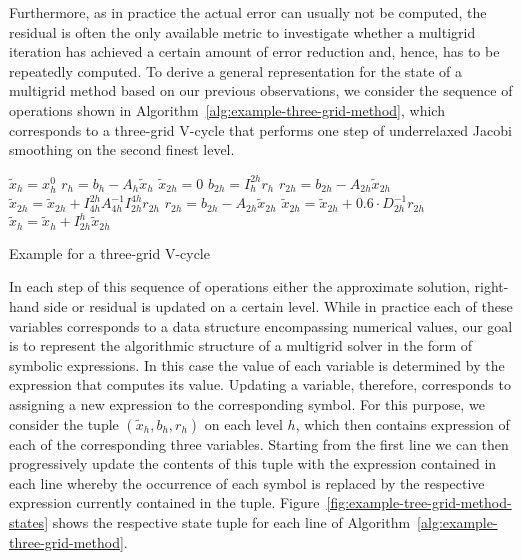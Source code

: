 Furthermore, as in practice the actual error can usually not be computed, the residual is often the only available metric to investigate whether a multigrid iteration has achieved a certain amount of error reduction and, hence, has to be repeatedly computed.
To derive a general representation for the state of a multigrid method based on our previous observations, we consider the sequence of operations shown in Algorithm~\ref{alg:example-three-grid-method}, which corresponds to a three-grid V-cycle that performs one step of underrelaxed Jacobi smoothing on the second finest level.
\begin{algorithm}
	\begin{algorithmic}[1]
		\State $\tilde{x}_{h} = x_{h}^0$
		\State $r_{h} = b_{h} - A_h \tilde{x}_{h} $
		\State $ \tilde{x}_{2h} = 0$
		\State $ b_{2h} = I_{h}^{2h} r_{h}$
		\State $ r_{2h} = b_{2h} - A_{2h} \tilde{x}_{2h}$
		\State $ \tilde{x}_{2h} = \tilde{x}_{2h} + I_{4h}^{2h} A_{4h}^{-1} I_{2h}^{4h} r_{2h}$
		\State $ r_{2h} = b_{2h} - A_{2h} \tilde{x}_{2h}$
		\State $ \tilde{x}_{2h} = \tilde{x}_{2h} + 0.6 \cdot D_{2h}^{-1} r_{2h}$
		\State $\tilde{x}_{h} = \tilde{x}_{h}  + I_{2h}^h \tilde{x}_{2h}$
	\end{algorithmic}
\caption{Example for a three-grid V-cycle}
\label{alg:example-three-grid-method}
\end{algorithm}
In each step of this sequence of operations either the approximate solution, right-hand side or residual is updated on a certain level.
While in practice each of these variables corresponds to a data structure encompassing numerical values, our goal is to represent the algorithmic structure of a multigrid solver in the form of symbolic expressions.
In this case the value of each variable is determined by the expression that computes its value.
Updating a variable, therefore, corresponds to assigning a new expression to the corresponding symbol.
For this purpose, we consider the tuple $(\tilde{x}_h, b_h, r_h)$ on each level $h$, which then contains expression of each of the corresponding three variables.
Starting from the first line we can then progressively update the contents of this tuple with the expression contained in each line whereby the occurrence of each symbol is replaced by the respective expression currently contained in the tuple.
Figure~\ref{fig:example-tree-grid-method-states} shows the respective state tuple for each line of Algorithm~\ref{alg:example-three-grid-method}.
